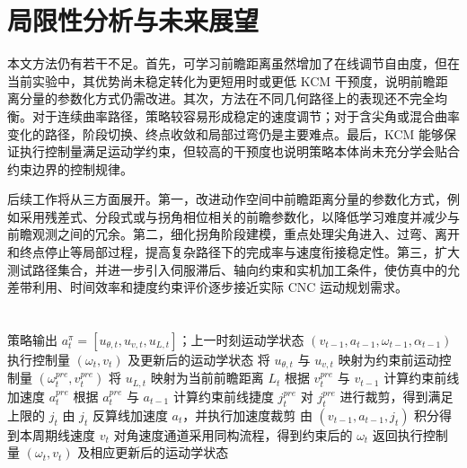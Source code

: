 \documentclass[preprint,12pt]{elsarticle}
\begin{document}
\section{局限性分析与未来展望}
\label{sec:conclusion}

本文方法仍有若干不足。首先，可学习前瞻距离虽然增加了在线调节自由度，但在当前实验中，其优势尚未稳定转化为更短用时或更低 KCM 干预度，说明前瞻距离分量的参数化方式仍需改进。其次，方法在不同几何路径上的表现还不完全均衡。对于连续曲率路径，策略较容易形成稳定的速度调节；对于含尖角或混合曲率变化的路径，阶段切换、终点收敛和局部过弯仍是主要难点。最后，KCM 能够保证执行控制量满足运动学约束，但较高的干预度也说明策略本体尚未充分学会贴合约束边界的控制规律。

后续工作将从三方面展开。第一，改进动作空间中前瞻距离分量的参数化方式，例如采用残差式、分段式或与拐角相位相关的前瞻参数化，以降低学习难度并减少与前瞻观测之间的冗余。第二，细化拐角阶段建模，重点处理尖角进入、过弯、离开和终点停止等局部过程，提高复杂路径下的完成率与速度衔接稳定性。第三，扩大测试路径集合，并进一步引入伺服滞后、轴向约束和实机加工条件，使仿真中的允差带利用、时间效率和捷度约束评价逐步接近实际 CNC 运动规划需求。

\appendix

\section{}

\begin{algorithm}[htbp]
\caption{KCM约束投影过程}
\label{alg:kcm}
\begin{algorithmic}[1]
\Require 策略输出 $a_t^{\pi}=[u_{\theta,t},u_{v,t},u_{L,t}]$；上一时刻运动学状态 $(v_{t-1},a_{t-1},\omega_{t-1},\alpha_{t-1})$
\Ensure 执行控制量 $(\omega_t,v_t)$ 及更新后的运动学状态
\State 将 $u_{\theta,t}$ 与 $u_{v,t}$ 映射为约束前运动控制量 $(\omega_t^{pre},v_t^{pre})$
\State 将 $u_{L,t}$ 映射为当前前瞻距离 $L_t$
\State 根据 $v_t^{pre}$ 与 $v_{t-1}$ 计算约束前线加速度 $a_t^{pre}$
\State 根据 $a_t^{pre}$ 与 $a_{t-1}$ 计算约束前线捷度 $j_t^{pre}$
\State 对 $j_t^{pre}$ 进行裁剪，得到满足上限的 $j_t$
\State 由 $j_t$ 反算线加速度 $a_t$，并执行加速度裁剪
\State 由 $(v_{t-1},a_{t-1},j_t)$ 积分得到本周期线速度 $v_t$
\State 对角速度通道采用同构流程，得到约束后的 $\omega_t$
\State 返回执行控制量 $(\omega_t,v_t)$ 及相应更新后的运动学状态
\end{algorithmic}
\end{algorithm}
\end{document}

